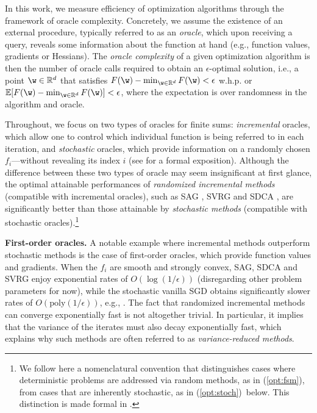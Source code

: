 \documentclass{article}
\theoremstyle{definition}  \newtheorem{exercise}{Exercise}
\theoremstyle{plain}
\newcommand{\pref}[1]{\prettyref{#1}}
\newcommand{\EE}{\mathbb{E}}
\newcommand{\RR}{\mathbb{R}}
\theoremstyle{definition}
\theoremstyle{remark}
\begin{document}
In this work, we measure efficiency of optimization algorithms through 
	the 
	framework of oracle complexity. Concretely, we assume the existence of 
	an 
	external procedure, typically referred to as an \emph{oracle}, which 
	upon 
	receiving a query, reveals some information about the function at hand 
	(e.g., function values, gradients or Hessians). The 
	\emph{oracle complexity} of a given optimization algorithm is then the number of oracle calls required to obtain an 
	$\epsilon$-optimal solution, i.e., a point $\w\in\RR^d$ that satisfies 
	$F(\w)-\min_{\w\in\RR^d} F(\w) <\epsilon$ w.h.p. or 
	$\EE[F(\w)-\min_{\w\in\RR^d} F(\w)]<\epsilon$, where the expectation is over randomness in the algorithm 
	and oracle. 
	
	
	Throughout, we focus on two types of oracles for finite sums: 
	\emph{incremental} oracles, which allow one to control which individual 
	function is being referred to in each iteration, and \emph{stochastic} 
	oracles, which provide information on a randomly chosen 
	$f_i$---without revealing its index $i$ (see \pref{sec:settings} for a 
	formal exposition). Although the difference between these two types of 
	oracle may seem insignificant at first glance, the optimal attainable 
	performances of \emph{randomized incremental methods} (compatible with 
	incremental oracles), such as SAG \cite{schmidt2013minimizing}, SVRG 
	\cite{johnson2013accelerating} and  SDCA \cite{shalev2013stochastic}, are
	significantly better than those attainable by \emph{stochastic methods} 
	(compatible with stochastic oracles).\footnote{We follow here a 
	nomenclatural convention that distinguishes cases where deterministic 
	problems are addressed via random methods, as in  (\ref{opt:fsm}), 
	from cases that are inherently stochastic, as in  (\ref{opt:stoch})~below. 
	This distinction is made formal in \pref{sec:settings}.} 


	\textbf{First-order oracles.} A notable example where incremental methods outperform stochastic 
	methods is the case of first-order oracles, which provide 
	function 
	values and gradients. When the $f_i$ are smooth and strongly convex, SAG, 
	SDCA 
	and SVRG enjoy exponential rates of $O(\log(1/\epsilon))$ 
	(disregarding 
	other problem parameters for now), while the stochastic vanilla SGD obtains 
	significantly 
	slower rates of	$O(\text{poly}(1/\epsilon))$, e.g., 
	\cite{shalev2011pegasos}. The fact that randomized incremental methods 
	can 
	converge exponentially fast is not altogether trivial. In particular, 
	it 
	implies that the variance of the iterates must also decay 
	exponentially 
	fast, which explains why such methods are often referred to as 
	\emph{variance-reduced methods}. 
	
\end{document}
